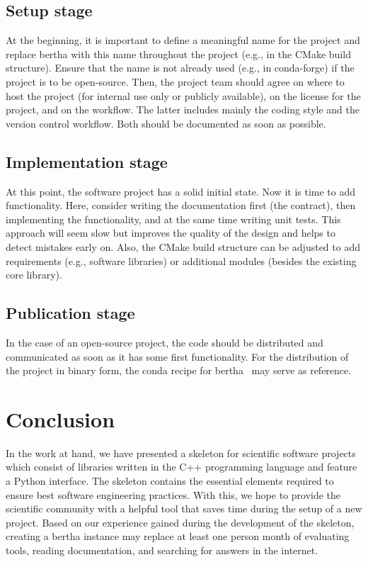\documentclass[@CLASSOPTIONS@]{tumarticle}
\begin{document}
\subsection{Setup stage}

At the beginning, it is important to define a meaningful name for the project
and replace bertha with this name throughout the project (e.g., in the CMake
build structure). Ensure that the name is not already used (e.g., in
conda-forge) if the project is to be open-source. Then, the project team
should agree on where to host the project (for internal use only or publicly
available), on the license for the project, and on the workflow. The latter
includes mainly the coding style and the version control workflow. Both
should be documented as soon as possible.

\subsection{Implementation stage}

At this point, the software project has a solid initial state. Now it is
time to add functionality. Here, consider writing the documentation first
(the contract), then implementing the functionality, and at the same time
writing unit tests. This approach will seem slow but improves the quality
of the design and helps to detect mistakes early on. Also, the CMake build
structure can be adjusted to add requirements (e.g., software libraries) or
additional modules (besides the existing core library).

\subsection{Publication stage}

In the case of an open-source project, the code should be distributed and
communicated as soon as it has some first functionality. For the
distribution of the project in binary form, the conda recipe for
bertha~\cite{bertha-feedstock} may serve as reference.

\section{Conclusion}

In the work at hand, we have presented a skeleton for scientific software
projects which consist of libraries written in the C++ programming language
and feature a Python interface. The skeleton contains the essential
elements required to ensure best software engineering practices. With this,
we hope to provide the scientific community with a helpful tool that saves
time during the setup of a new project. Based on our experience gained
during the development of the skeleton, creating a bertha instance may
replace at least one person month of evaluating tools, reading documentation,
and searching for answers in the internet.
\end{document}
